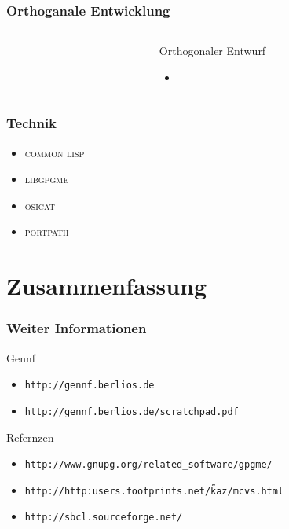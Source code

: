 \documentclass[german]{beamer}
\newcommand{\COMMONLISP}{\textsc{common lisp}}
\newcommand{\LIBGPGME}{\textsc{libgpgme}}
\newcommand{\OSICAT}{\textsc{osicat}}
\newcommand{\PORTPATH}{\textsc{portpath}}
\begin{document}
\begin{frame}
  \frametitle{Orthoganale Entwicklung}
  \begin{columns}
    \begin{column}{5cm}
      
    \end{column}
    \begin{column}{7cm}
      \begin{block}{Orthogonaler Entwurf}
        \begin{itemize}
        \item
        \end{itemize}
      \end{block}

    \end{column}
  \end{columns}
\end{frame}

\begin{frame}
  \frametitle{Technik}
  \begin{itemize}
  \item \COMMONLISP{}
  \item \LIBGPGME{}
  \item \OSICAT{}
  \item \PORTPATH{}
  \end{itemize}
\end{frame}

\section{Zusammenfassung}

\begin{frame}
  \frametitle{Weiter Informationen}
  \begin{block}{Gennf}
    \begin{itemize}
    \item \tt{http://gennf.berlios.de}
    \item \tt{http://gennf.berlios.de/scratchpad.pdf}
    \end{itemize}
  \end{block}
  \begin{block}{Refernzen}
    \begin{itemize}
    \item \tt{http://www.gnupg.org/related\_software/gpgme/}
    \item \tt{http://http:users.footprints.net/\~kaz/mcvs.html}
    \item \tt{http://sbcl.sourceforge.net/}
    \end{itemize}
  \end{block}
\end{frame}
\end{document}
